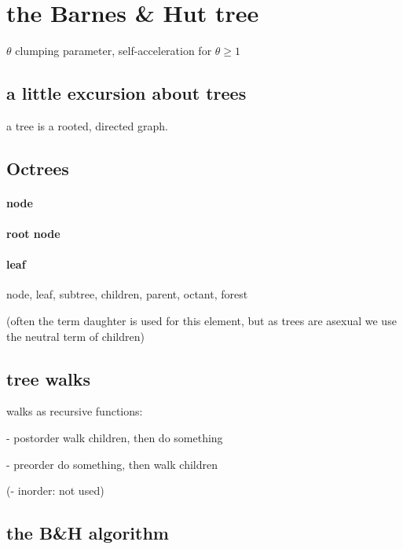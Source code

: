
\section{the Barnes \& Hut tree}

$\theta$ clumping parameter, self-acceleration for $\theta \ge 1$
\cite{1986Natur.324..446B}

\subsection{a little excursion about trees}
a tree is a rooted, directed graph.

\subsection{Octrees}

\paragraph{node}

\paragraph{root node}

\paragraph{leaf}
node, leaf, subtree, children, parent, octant, forest

(often the term daughter is used for this element, but as trees are asexual we use the neutral term of children)

\subsection{tree walks}

walks as recursive functions:

- postorder
walk children, then do something

- preorder
do something, then walk children

(- inorder:
not used)

\subsection{the B\&H algorithm}